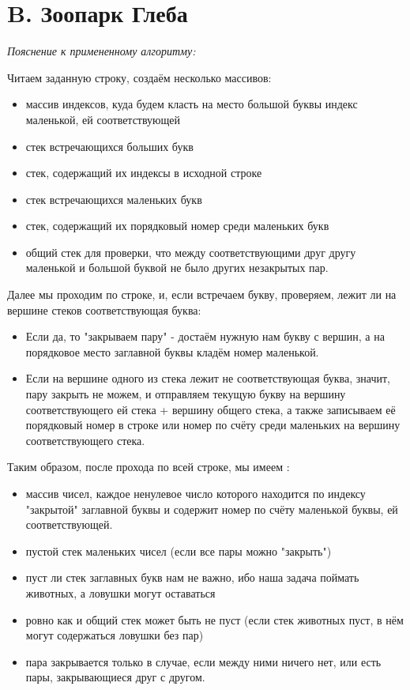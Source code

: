 \section{B. Зоопарк Глеба}
\textit{Пояснение к примененному алгоритму:} \par
Читаем заданную строку, создаём несколько массивов:
\begin{itemize}
    \item массив индексов, куда будем класть на место большой буквы индекс маленькой, ей соответствующей
    \item стек встречающихся больших букв
    \item стек, содержащий их индексы в исходной строке
    \item стек встречающихся маленьких букв
    \item стек, содержащий их порядковый номер среди маленьких букв
    \item общий стек для проверки, что между соответствующими друг другу маленькой и большой буквой не было других незакрытых пар.
\end{itemize}
Далее мы проходим по строке, и, если встречаем букву, проверяем, лежит ли на вершине стеков соответствующая буква:
\begin{itemize}
    \item Если да, то "закрываем пару" - достаём нужную нам букву с вершин, а на порядковое место заглавной буквы кладём номер маленькой.
    \item Если на вершине одного из стека лежит не соответствующая буква, значит, пару закрыть не можем, и отправляем текущую букву на вершину соответствующего ей стека + вершину общего стека, а также записываем её порядковый номер в строке или номер по счёту среди маленьких на вершину соответствующего стека.
\end{itemize}
Таким образом, после прохода по всей строке, мы имеем :
\begin{itemize}
    \item[\ding{51}] массив чисел, каждое ненулевое число которого находится по индексу "закрытой" заглавной буквы и содержит номер по счёту маленькой буквы, ей соответствующей.
    \item[\ding{51}] пустой стек маленьких чисел (если все пары можно "закрыть")
    \item[\ding{43}] пуст ли стек заглавных букв нам не важно, ибо наша задача поймать животных, а ловушки могут оставаться
    \item[\ding{43}] ровно как и общий стек может быть не пуст (если стек животных пуст, в нём могут содержаться ловушки без пар)
    \item[\ding{43}] пара закрывается только в случае, если между ними ничего нет, или есть пары, закрывающиеся друг с другом.
\end{itemize}
\BgThispage
\newpage

